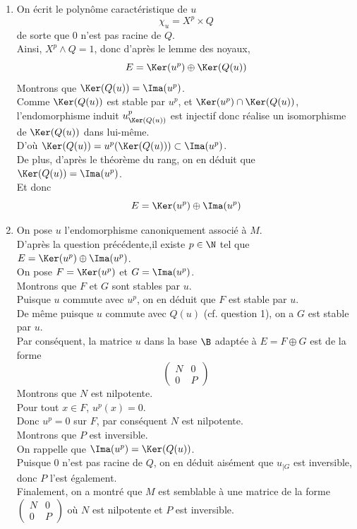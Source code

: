 \documentclass[8pt]{book}
\begin{document}
	\begin{enumerate}[leftmargin=*]
		\item On écrit le polynôme caractéristique de $u$ \[\chi_u=X^p\times Q\] de sorte que $0$ n'est pas racine de $Q$.\\
		Ainsi, $X^p\wedge Q=1$, donc d'après le lemme des noyaux, \[E=\Ker(u^p)\oplus\Ker(Q(u))\]
		Montrons que $\Ker(Q(u))=\Ima(u^p)$.\\
		Comme $\Ker(Q(u))$ est stable par $u^p$, et $\Ker(u^p)\cap\Ker(Q(u))$, l'endomorphisme induit $u^p_{\Ker(Q(u))}$ est injectif donc réalise un isomorphisme de $\Ker(Q(u))$ dans lui-même.\\
		D'où $\Ker(Q(u))=u^p(\Ker(Q(u)))\subset \Ima(u^p)$.\\
		De plus, d'après le théorème du rang, on en déduit que $\Ker(Q(u))=\Ima(u^p)$.\\
		Et donc \[E=\Ker(u^p)\oplus \Ima(u^p)\]
		\item On pose $u$ l'endomorphisme canoniquement associé à $M$.\\
		D'après la question précédente,il existe $p\in\N$ tel que $E=\Ker(u^p)\oplus\Ima(u^p)$.\\
		On pose $F=\Ker(u^p)$ et $G=\Ima(u^p)$.\\
		Montrons que $F$ et $G$ sont stables par $u$.\\
		Puisque $u$ commute avec $u^p$, on en déduit que $F$ est stable par $u$.\\
		De même puisque $u$ commute avec $Q(u)$ (cf. question 1), on a $G$ est stable par $u$.\\
		Par conséquent, la matrice $u$ dans la base $\B$ adaptée à $E=F\oplus G$ est de la forme \[\begin{pmatrix}
			N&0\\0&P
		\end{pmatrix}\]
		Montrons que $N$ est nilpotente.\\
		Pour tout $x\in F$, $u^p(x)=0$.\\
		Donc $u^p=0$ sur $F$, par conséquent $N$ est nilpotente.\\
		Montrons que $P$ est inversible.\\
		On rappelle que $\Ima(u^p)=\Ker(Q(u))$.\\
		Puisque $0$ n'est pas racine de $Q$, on en déduit aisément que $u_{|G}$ est inversible, donc $P$ l'est également.\\
		Finalement, on a montré que $M$ est semblable à une matrice de la forme $\begin{pmatrix}
			N&0\\0&P
		\end{pmatrix}$ où $N$ est nilpotente et $P$ est inversible.		
		 
	\end{enumerate}
	
\end{document}
